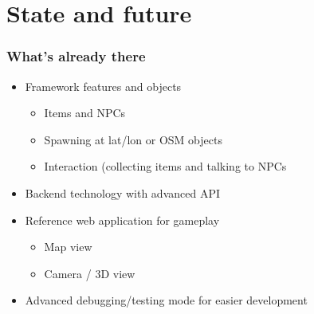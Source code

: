 \documentclass[aspectratio=43]{beamer}
\begin{document}
 \section{State and future}

 \begin{frame}
  \frametitle{What's already there}

  \begin{itemize}
   \item{Framework features and objects
    \begin{itemize}
     \item{Items and NPCs}
     \item{Spawning at lat/lon or OSM objects}
     \item{Interaction (collecting items and talking to NPCs}
    \end{itemize}
   }
   \item{Backend technology with advanced API}
   \item{Reference web application for gameplay
    \begin{itemize}
     \item{Map view}
     \item{Camera / 3D view}
    \end{itemize}
   }
   \item{Advanced debugging/testing mode for easier development}
  \end{itemize}
 \end{frame}
\end{document}
